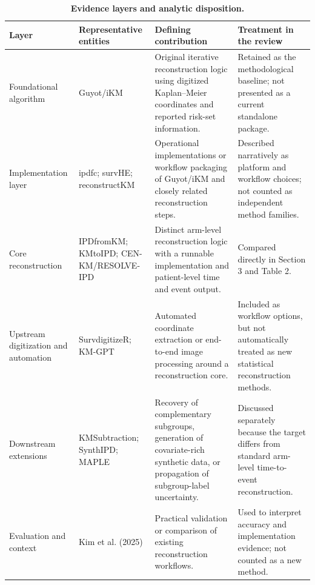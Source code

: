 \documentclass[12pt,letterpaper]{article}
\begin{document}
\begin{table}[!ht]
\centering
\caption{\textbf{Evidence layers and analytic disposition.}}
\label{tab:evidence}
\begin{nolinenumbers}
\begingroup
{}
\setlength{\tabcolsep}{3pt}
\renewcommand{\arraystretch}{1.25}
\small
\begin{tabular}{|>{\raggedright\arraybackslash}p{0.95in}|>{\raggedright\arraybackslash}p{1.22in}|>{\raggedright\arraybackslash}p{2.00in}|>{\raggedright\arraybackslash}p{2.00in}|}
\hline
\rowcolor{gray!18} \textbf{Layer} & \textbf{Representative entities} & \textbf{Defining contribution} & \textbf{Treatment in the review} \\ \hline
Foundational algorithm & Guyot/iKM & Original iterative reconstruction logic using digitized Kaplan--Meier coordinates and reported risk-set information. & Retained as the methodological baseline; not presented as a current standalone package. \\ \hline
Implementation layer & ipdfc; survHE; reconstructKM & Operational implementations or workflow packaging of Guyot/iKM and closely related reconstruction steps. & Described narratively as platform and workflow choices; not counted as independent method families. \\ \hline
Core reconstruction & IPDfromKM; KMtoIPD; CEN-KM/RESOLVE-IPD & Distinct arm-level reconstruction logic with a runnable implementation and patient-level time and event output. & Compared directly in Section 3 and Table 2. \\ \hline
Upstream digitization and automation & SurvdigitizeR; KM-GPT & Automated coordinate extraction or end-to-end image processing around a reconstruction core. & Included as workflow options, but not automatically treated as new statistical reconstruction methods. \\ \hline
Downstream extensions & KMSubtraction; SynthIPD; MAPLE & Recovery of complementary subgroups, generation of covariate-rich synthetic data, or propagation of subgroup-label uncertainty. & Discussed separately because the target differs from standard arm-level time-to-event reconstruction. \\ \hline
Evaluation and context & Kim et al. (2025) & Practical validation or comparison of existing reconstruction workflows. & Used to interpret accuracy and implementation evidence; not counted as a new method. \\ \hline
\end{tabular}
\endgroup
\end{nolinenumbers}
\end{table}
\end{document}
